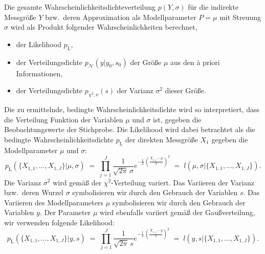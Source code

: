 Die gesamte Wahrscheinlichkeitsdichteverteilung $p(Y,\sigma)$ für die indirekte Messgröße
$Y$ bzw.\ deren Approximation als Modellparameter $P = \mu$ mit Streuung $\sigma$ wird als Produkt
folgender Wahrscheinlichkeiten berechnet,
\begin{itemize}
\item der Likelihood $p_\mathrm{L}$,
\item der Verteilungsdichte $p_\mathcal{N}(y | y_0, s_0)$ der Größe $\mu$ aus den {\`a} priori Informationen,
\item der Verteilungsdichte $p_{\chi^2,\nu}(s)$ der Varianz $\sigma^2$ dieser Größe.
\end{itemize}
Die zu ermittelnde, bedingte Wahrscheinlichkeitsdichte wird so interpretiert, dass die Verteilung Funktion
der Variablen $\mu$ und $\sigma$ ist, gegeben die Beobachtungswerte der Stichprobe. Die Likelihood wird
dabei betrachtet als die bedingte Wahrscheinlichkeitsdichte $p_\mathrm{L}$ der
direkten Messgröße $X_1$ gegeben die Modellparameter $\mu$ und $\sigma$:
\begin{equation}
p_\mathrm{L}(\{X_{1,1}, \dots, X_{1,J}\} | \mu, \sigma) \; = \;
\prod\limits_{j=1}^J \frac{1}{\sqrt{2 \pi} \, \sigma}
 e^{- \frac{1}{2} \, \left( \frac{X_{1,j} - \mu}{\sigma} \right)^2 }  \; = \;
l(\mu, \sigma | \{X_{1,1}, \dots, X_{1,J}\}).
\end{equation}
Die Varianz $\sigma^2$ wird gemäß der $\chi^2$-Verteilung variert. Das Variieren der Varianz
bzw.\ deren Wurzel $\sigma$ symbolisieren wir durch den Gebrauch der Variablen $s$.
Das Variieren des Modellparameters $\mu$ symbolisieren wir durch den Gebrauch der Variablen $y$.
Der Parameter $\mu$ wird ebenfalls variiert gemäß der Gaußverteilung, wir verwenden folgende
Likelihood:
\begin{equation}
p_\mathrm{L}(\{X_{1,1}, \dots, X_{1,J}\} | y, s) \; = \;
\prod\limits_{j=1}^J \frac{1}{\sqrt{2 \pi} \, s}
 e^{- \frac{1}{2} \, \left( \frac{X_{1,j} - y}{s} \right)^2 }  \; = \;
l(y, s | \{X_{1,1}, \dots, X_{1,J}\}).
\end{equation}

